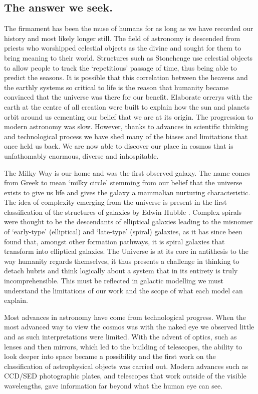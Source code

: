 \subsection{The answer we seek.}
The firmament has been the muse of humans for as long as we have recorded our history and most likely longer still. The field of astronomy is descended from priests who worshipped celestial objects as the divine and sought for them to bring meaning to their world. Structures such as Stonehenge use celestial objects to allow people to track the `repetitious' passage of time, thus being able to predict the seasons. It is possible that this correlation between the heavens and the earthly systems so critical to life is the reason that humanity became convinced that the universe was there for our benefit. Elaborate orrerys with the earth at the centre of all creation were built to explain how the sun and planets orbit around us cementing our belief that we are at its origin. 
The progression to modern astronomy was slow. However, thanks to advances in scientific thinking and technological process we have shed many of the biases and limitations that once held us back. We are now able to discover our place in cosmos that is unfathomably enormous, diverse and inhospitable. 

The Milky Way is our home and was the first observed galaxy. The name comes from Greek to mean `milky circle' stemming from our belief that the universe exists to give us life and gives the galaxy a mammalian nurturing characteristic. The idea of complexity emerging from the universe is present in the first classification of the structures of galaxies by Edwin Hubble \citep{Hubble1926Extra-galacticNebulae.,Hubble1927TheNebulae}.
Complex spirals were thought to be the descendants of elliptical galaxies leading to the misnomer of `early-type' (elliptical) and `late-type' (spiral) galaxies, as it has since been found that, amongst other formation pathways, it is spiral galaxies that transform into elliptical galaxies. The Universe is at its core in antithesis to the way humanity regards themselves, it thus presents a challenge in thinking to detach hubris and think logically about a system that in its entirety is truly incomprehensible. This must be reflected in galactic modelling we must understand the limitations of our work and the scope of what each model can explain.

Most advances in astronomy have come from technological progress. When the most advanced way to view the cosmos was with the naked eye we observed little and as such interpretations were limited. With the advent of optics, such as lenses and then mirrors, which led to the building of telescopes, the ability to look deeper into space became a possibility and the first work on the classification of astrophysical objects was carried out. Modern advances such as CCD/SED photographic plates, and telescopes that work outside of the visible wavelengths, gave information far beyond what the human eye can see. 

